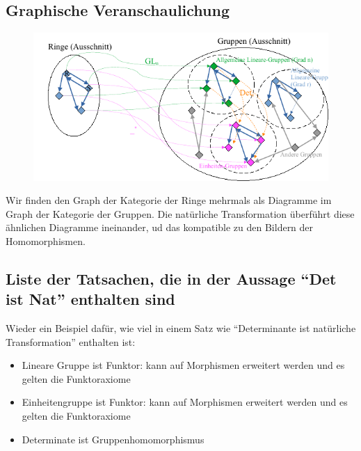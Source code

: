 \documentclass[a4paper]{amsart}
\theoremstyle{definition}
\begin{document}
\subsection{Graphische Veranschaulichung}
\begin{figure}[h]
   \centering
   \includegraphics[width=\textwidth]{v5.0.1.0.4.4.5 Determinante als Natürliche Transformationen Bild.pdf}
\end{figure}

Wir finden den Graph der Kategorie der Ringe mehrmals als Diagramme im Graph der Kategorie der Gruppen. Die natürliche Transformation überführt diese ähnlichen Diagramme ineinander, ud das kompatible zu den Bildern der Homomorphismen.

\subsection{Liste der Tatsachen, die in der Aussage "`Det ist Nat"' enthalten sind}
Wieder ein Beispiel dafür, wie viel in einem Satz wie "`Determinante ist natürliche Transformation"' enthalten ist:
\begin{itemize}
   \item Lineare Gruppe ist Funktor: kann auf Morphismen erweitert werden und es gelten die Funktoraxiome
   \item Einheitengruppe ist Funktor: kann auf Morphismen erweitert werden und es gelten die Funktoraxiome
   \item Determinate ist Gruppenhomomorphismus
\end{itemize}
\end{document}
